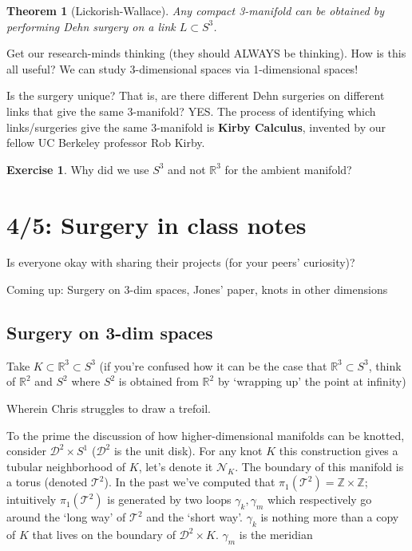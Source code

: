 \documentclass[11pt]{article}
\newcommand{\Z}{\mathbb{Z}}
\newcommand{\R}{\mathbb{R}}
\newcommand{\D}{\mathcal{D}}
\newcommand{\T}{\mathcal{T}}
\newcommand{\NN}{\mathcal{N}}
\theoremstyle{plain}
\newtheorem{thm}{Theorem}
\theoremstyle{definition}
\newtheorem{exercise}{Exercise}
\begin{document}
\begin{thm}[Lickorish-Wallace]
Any compact 3-manifold can be obtained by performing Dehn surgery on a link $L\subset S^3$.
\end{thm}

Get our research-minds thinking (they should ALWAYS be thinking). How is this all useful? We can study 3-dimensional spaces via 1-dimensional spaces!

Is the surgery unique? That is, are there different Dehn surgeries on different links that give the same 3-manifold? YES. The process of identifying which links/surgeries give the same 3-manifold is \textbf{Kirby Calculus}, invented by our fellow UC Berkeley professor Rob Kirby.

\begin{exercise}
Why did we use $S^3$ and not $\R^3$ for the ambient manifold?
\end{exercise}



\section{4/5: Surgery in class notes}

Is everyone okay with sharing their projects (for your peers' curiosity)?

Coming up: Surgery on 3-dim spaces, Jones' paper, knots in other dimensions

\subsection{Surgery on 3-dim spaces}

Take $K \subset \R^3 \subset S^3$ (if you're confused how it can be the case that $\R^3 \subset S^3$, think of $\R^2$ and $S^2$ where $S^2$ is obtained from $\R^2$ by `wrapping up' the point at infinity)

Wherein Chris struggles to draw a trefoil.

To the prime the discussion of how higher-dimensional manifolds can be knotted, consider $\D^2 \times S^1$ ($\D^2$ is the unit disk). For any knot $K$ this construction gives a tubular neighborhood of $K$, let's
denote it $\NN_K$.
The boundary of this manifold is a torus (denoted $\T^2$). In the past we've computed that $\pi_1(\T^2) = \Z \times \Z$; intuitively $\pi_1(\T^2)$ is generated by two loops $\gamma_k, \gamma_m$ which respectively
go around the `long way' of $\T^2$ and the `short way'. $\gamma_k$ is nothing more than a copy of $K$ that lives on the boundary of $\D^2 \times K$.
$\gamma_m$ is the meridian
\end{document}
